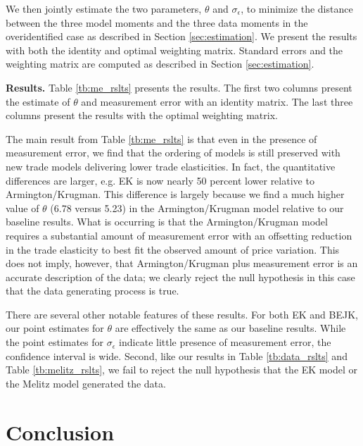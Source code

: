 \documentclass[12pt,dvips, ps2pdf]{article}
\begin{document}
We then jointly estimate the two parameters, $\theta$ and $\sigma_{\epsilon}$, to minimize the distance between the three model moments and the three data moments in the overidentified case as described in Section \ref{sec:estimation}. We present the results with both the identity and optimal weighting matrix. Standard errors and the weighting matrix are computed as described in Section \ref{sec:estimation}.

\textbf{Results.} Table \ref{tb:me_rslts} presents the results. The first two columns present the estimate of $\theta$ and measurement error with an identity matrix. The last three columns present the results with the optimal weighting matrix.

The main result from Table \ref{tb:me_rslts} is that even in the presence of measurement error, we find that the ordering of models is still preserved with new trade models delivering lower trade elasticities. In fact, the quantitative differences are larger, e.g. EK is now nearly 50 percent lower relative to Armington/Krugman. This difference is largely because we find a much higher value of $\theta$ (6.78 versus 5.23) in the Armington/Krugman model relative to our baseline results. What is occurring is that the Armington/Krugman model requires a substantial amount of measurement error with an offsetting reduction in the trade elasticity to best fit the observed amount of price variation. This does not imply, however, that Armington/Krugman plus measurement error is an accurate description of the data; we clearly reject the null hypothesis in this case that the data generating process is true.

There are several other notable features of these results. For both EK and BEJK, our point estimates for $\theta$ are effectively the same as our baseline results. While the point estimates for $\sigma_{\epsilon}$ indicate little presence of measurement error, the confidence interval is wide. Second, like our results in Table \ref{tb:data_rslts} and Table \ref{tb:melitz_rslts}, we fail to reject the null hypothesis that the EK model or the Melitz model generated the data.

\section{Conclusion}
\end{document}
